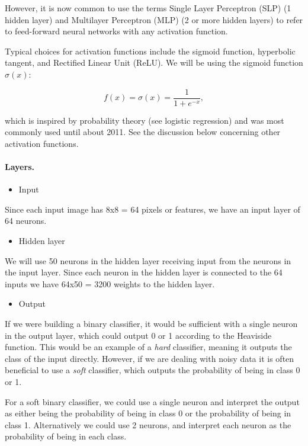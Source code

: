 \documentclass[%
oneside,                 %
final,                   %
10pt]{article}
\begin{document}
However, it is now common to use the terms Single Layer Perceptron (SLP) (1 hidden layer) and  
Multilayer Perceptron (MLP) (2 or more hidden layers) to refer to feed-forward neural networks with any activation function.  

Typical choices for activation functions include the sigmoid function, hyperbolic tangent, and Rectified Linear Unit (ReLU).  
We will be using the sigmoid function $\sigma(x)$:  

$$ f(x) = \sigma(x) = \frac{1}{1 + e^{-x}} ,$$

which is inspired by probability theory (see logistic regression) and was most commonly used until about 2011. See the discussion below concerning other activation functions.

\paragraph{Layers.}
\begin{itemize}
\item Input 
\end{itemize}

\noindent
Since each input image has 8x8 = 64 pixels or features, we have an input layer of 64 neurons.  

\begin{itemize}
\item Hidden layer
\end{itemize}

\noindent
We will use 50 neurons in the hidden layer receiving input from the neurons in the input layer.  
Since each neuron in the hidden layer is connected to the 64 inputs we have 64x50 = 3200 weights to the hidden layer.  

\begin{itemize}
\item Output
\end{itemize}

\noindent
If we were building a binary classifier, it would be sufficient with a single neuron in the output layer,
which could output 0 or 1 according to the Heaviside function. This would be an example of a \emph{hard} classifier, meaning it outputs the class of the input directly. However, if we are dealing with noisy data it is often beneficial to use a \emph{soft} classifier, which outputs the probability of being in class 0 or 1.  

For a soft binary classifier, we could use a single neuron and interpret the output as either being the probability of being in class 0 or the probability of being in class 1. Alternatively we could use 2 neurons, and interpret each neuron as the probability of being in each class.  
\end{document}

